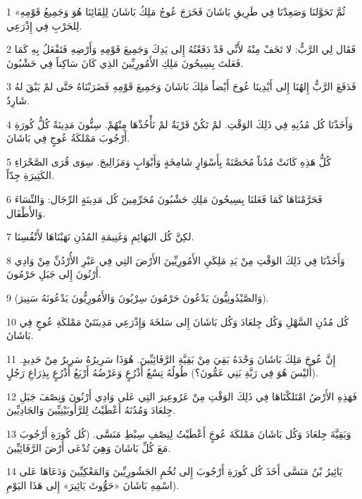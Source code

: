 \par 1 «ثُمَّ تَحَوَّلنَا وَصَعِدْنَا فِي طَرِيقِ بَاشَانَ فَخَرَجَ عُوجُ مَلِكُ بَاشَانَ لِلِقَائِنَا هُوَ وَجَمِيعُ قَوْمِهِ لِلحَرْبِ فِي إِذْرَعِي.
\par 2 فَقَال لِي الرَّبُّ: لا تَخَفْ مِنْهُ لأَنِّي قَدْ دَفَعْتُهُ إِلى يَدِكَ وَجَمِيعَ قَوْمِهِ وَأَرْضِهِ فَتَفْعَلُ بِهِ كَمَا فَعَلتَ بِسِيحُونَ مَلِكِ الأَمُورِيِّينَ الذِي كَانَ سَاكِناً فِي حَشْبُونَ.
\par 3 فَدَفَعَ الرَّبُّ إِلهُنَا إِلى أَيْدِينَا عُوجَ أَيْضاً مَلِكَ بَاشَانَ وَجَمِيعَ قَوْمِهِ فَضَرَبْنَاهُ حَتَّى لمْ يَبْقَ لهُ شَارِدٌ.
\par 4 وَأَخَذْنَا كُل مُدُنِهِ فِي ذَلِكَ الوَقْتِ. لمْ تَكُنْ قَرْيَةٌ لمْ نَأْخُذْهَا مِنْهُمْ. سِتُّونَ مَدِينَةً كُلُّ كُورَةِ أَرْجُوبَ مَمْلكَةُ عُوجٍ فِي بَاشَانَ.
\par 5 كُلُّ هَذِهِ كَانَتْ مُدُناً مُحَصَّنَةً بِأَسْوَارٍ شَامِخَةٍ وَأَبْوَابٍ وَمَزَالِيجَ. سِوَى قُرَى الصَّحْرَاءِ الكَثِيرَةِ جِدّاً.
\par 6 فَحَرَّمْنَاهَا كَمَا فَعَلنَا بِسِيحُونَ مَلِكِ حَشْبُونَ مُحَرِّمِينَ كُل مَدِينَةٍ الرِّجَال: وَالنِّسَاءَ وَالأَطْفَال.
\par 7 لكِنَّ كُل البَهَائِمِ وَغَنِيمَةِ المُدُنِ نَهَبْنَاهَا لأَنْفُسِنَا.
\par 8 وَأَخَذْنَا فِي ذَلِكَ الوَقْتِ مِنْ يَدِ مَلِكَيِ الأَمُورِيِّينَ الأَرْضَ التِي فِي عَبْرِ الأُرْدُنِّ مِنْ وَادِي أَرْنُونَ إِلى جَبَلِ حَرْمُونَ.
\par 9 (وَالصَّيْدُونِيُّونَ يَدْعُونَ حَرْمُونَ سِرْيُونَ وَالأَمُورِيُّونَ يَدْعُونَهُ سَنِيرَ).
\par 10 كُل مُدُنِ السَّهْلِ وَكُل جِلعَادَ وَكُل بَاشَانَ إِلى سَلخَةَ وَإِذْرَعِي مَدِينَتَيْ مَمْلكَةِ عُوجٍ فِي بَاشَانَ.
\par 11 إِنَّ عُوجَ مَلِكَ بَاشَانَ وَحْدَهُ بَقِيَ مِنْ بَقِيَّةِ الرَّفَائِيِّينَ. هُوَذَا سَرِيرُهُ سَرِيرٌ مِنْ حَدِيدٍ. (أَليْسَ هُوَ فِي رَبَّةِ بَنِي عَمُّونَ؟) طُولُهُ تِسْعُ أَذْرُعٍ وَعَرْضُهُ أَرْبَعُ أَذْرُعٍ بِذِرَاعِ رَجُلٍ.
\par 12 فَهَذِهِ الأَرْضُ امْتَلكْنَاهَا فِي ذَلِكَ الوَقْتِ مِنْ عَرُوعِيرَ التِي عَلى وَادِي أَرْنُونَ وَنِصْفَ جَبَلِ جِلعَادَ وَمُدُنَهُ أَعْطَيْتُ لِلرَّأُوبَيْنِيِّينَ وَالجَادِيِّينَ.
\par 13 وَبَقِيَّةَ جِلعَادَ وَكُل بَاشَانَ مَمْلكَةَ عُوجٍَ أَعْطَيْتُ لِنِصْفِ سِبْطِ مَنَسَّى. (كُل كُورَةِ أَرْجُوبَ مَعَ كُلِّ بَاشَانَ وَهِيَ تُدْعَى أَرْضَ الرَّفَائِيِّينَ.
\par 14 يَائِيرُ بْنُ مَنَسَّى أَخَذَ كُل كُورَةِ أَرْجُوبَ إِلى تُخُمِ الجَشُورِيِّينَ وَالمَعْكِيِّينَ وَدَعَاهَا عَلى اسْمِهِ بَاشَانَ «حَوُّوثَ يَائِيرَ» إِلى هَذَا اليَوْمِ).
